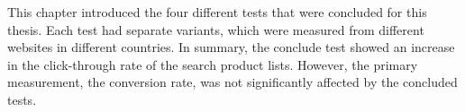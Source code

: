 This chapter introduced the four different tests that were concluded for this thesis.
Each test had separate variants, which were measured from different websites in different countries.
In summary, the conclude test showed an increase in the click-through rate of the search product lists. 
However, the primary measurement, the conversion rate, was not significantly affected by the concluded tests.


\newpage





